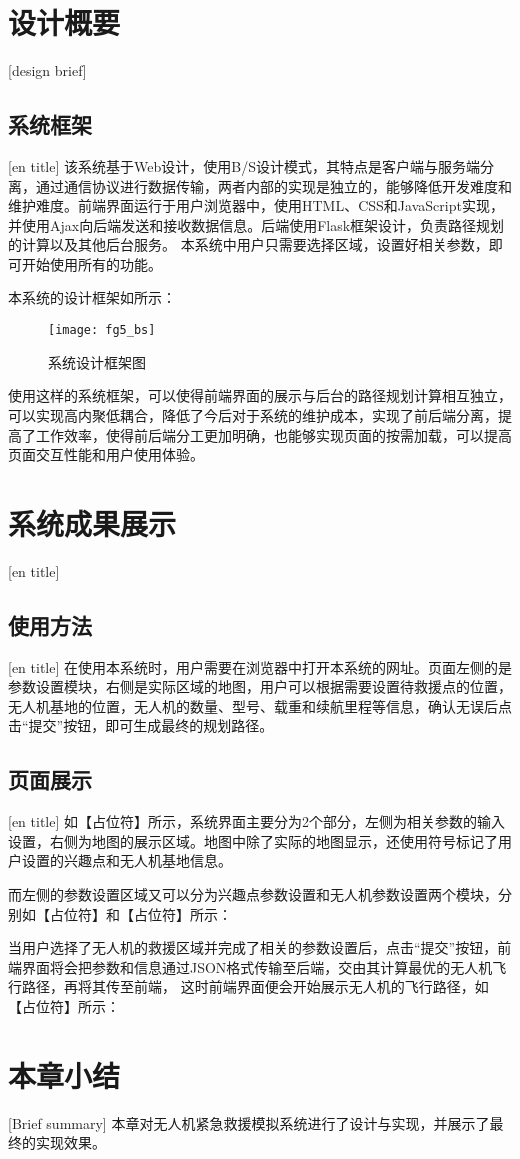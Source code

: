 \section{设计概要}[design brief]
\subsection{系统框架}[en title]
该系统基于Web设计，使用B/S设计模式，其特点是客户端与服务端分离，通过通信协议进行数据传输，两者内部的实现是独立的，能够降低开发难度和维护难度。前端界面运行于用户浏览器中，使用HTML、CSS和JavaScript实现，并使用Ajax向后端发送和接收数据信息。后端使用Flask框架设计，负责路径规划的计算以及其他后台服务。
本系统中用户只需要选择区域，设置好相关参数，即可开始使用所有的功能。


本系统的设计框架如所示：

\begin{figure}[ht]
	\centering
	\texttt{[image: fg5\_bs]}
	\caption{系统设计框架图}
	\label{fg601}
\end{figure}


使用这样的系统框架，可以使得前端界面的展示与后台的路径规划计算相互独立，可以实现高内聚低耦合，降低了今后对于系统的维护成本，实现了前后端分离，提高了工作效率，使得前后端分工更加明确，也能够实现页面的按需加载，可以提高页面交互性能和用户使用体验。

\section{系统成果展示}[en title]
\subsection{使用方法}[en title]
在使用本系统时，用户需要在浏览器中打开本系统的网址。页面左侧的是参数设置模块，右侧是实际区域的地图，用户可以根据需要设置待救援点的位置，无人机基地的位置，无人机的数量、型号、载重和续航里程等信息，确认无误后点击“提交”按钮，即可生成最终的规划路径。
\subsection{页面展示}[en title]
如【占位符】所示，系统界面主要分为2个部分，左侧为相关参数的输入设置，右侧为地图的展示区域。地图中除了实际的地图显示，还使用符号标记了用户设置的兴趣点和无人机基地信息。

而左侧的参数设置区域又可以分为兴趣点参数设置和无人机参数设置两个模块，分别如【占位符】和【占位符】所示：

当用户选择了无人机的救援区域并完成了相关的参数设置后，点击“提交”按钮，前端界面将会把参数和信息通过JSON格式传输至后端，交由其计算最优的无人机飞行路径，再将其传至前端，
这时前端界面便会开始展示无人机的飞行路径，如【占位符】所示：

\section{本章小结}[Brief summary]
本章对无人机紧急救援模拟系统进行了设计与实现，并展示了最终的实现效果。